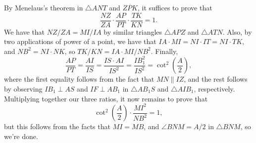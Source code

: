 \begin{solution}
By Menelaus's theorem in $\triangle{ANT}$ and $\overline{ZPK}$, it suffices to prove that 
\[\frac{NZ}{ZA}\cdot \frac{AP}{PT}\cdot \frac{TK}{KN} = 1.\]
We have that $NZ/ZA = MI/IA$ by similar triangles $\triangle{APZ}$ and $\triangle{ATN}$. Also, by two applications of power of a point, we have that $IA\cdot MI=NI\cdot IT = NI\cdot TK$, and $NB^2 = NI\cdot NK$, so $TK/KN = IA\cdot MI/NB^2$. Finally, 
\[\frac{AP}{PT} = \frac{AI}{IS} = \frac{IS\cdot AI}{IS^2} = \frac{IB_1^2}{IS^2} = \cot^2{\left(\frac{A}{2}\right)},\]
where the first equality follows from the fact that $MN\parallel IZ$, and the rest follows by observing $IB_1\perp AS$ and $IF\perp AB_1$ in $\triangle{AB_1S}$ and $\triangle{AIB_1}$, respectively. Multiplying together our three ratios, it now remains to prove that 
\[\cot^2{\left(\frac{A}{2}\right)} \cdot \frac{MI^2}{NB^2}=1,\]
but this follows from the facts that $MI=MB$, and $\angle{BNM} = A/2$ in $\triangle{BNM}$, so we're done.
\end{solution}













